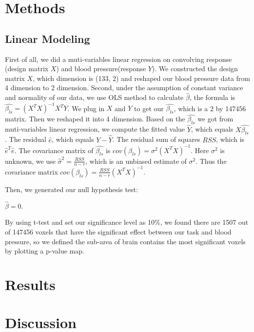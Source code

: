 \documentclass[11pt]{article}
\begin{document}
\section{Methods}
\subsection{Linear Modeling}
First of all, we did a muti-variables linear regression on convolving response 
(design matrix $X$) and blood pressure(response $Y$). We constructed the design 
matrix $X$, which dimension is (133, 2) and reshaped our blood pressure data from 
4 dimension to 2 dimension. Second, under the assumption of constant variance
and normality of our data, we use OLS method to calculate $\hat{\beta}$, the 
formula is $\hat{\beta_{ls}}=(X^{T}X)^{-1}X^{T}Y$. We plug in $X$ and $Y$ to get
our $\hat{\beta_{ls}}$, which is a 2 by 147456 matrix. Then we reshaped it into 
4 dimension. Based on the $\hat{\beta_{ls}}$ we got from muti-variables linear 
regression, we compute the fitted value $\hat{Y}$, which equals 
$X\hat{\beta_{ls}}$. The residual $\hat{e}$, which equals $Y-\hat{Y}$. The 
residual sum of squares $RSS$, which is $\hat{e}^{T}\hat{e}$. The covariance
matrix of $\hat{\beta_{ls}}$ is $cov(\beta_{ls}) = \sigma^2(X^{T}X)^{-1}$. Here $\sigma^2$
is unknown, we use $\hat{\sigma}^2 = \frac{RSS}{n-r}$, which is an unbiased 
estimate of $\sigma^2$. Thus the covariance matrix 
$cov(\beta_{ls}) = \frac{RSS}{n-r}(X^{T}X)^{-1}$.

Then, we generated our null hypothesis test:

$\hat{\beta} = 0$.

By using t-test and set our significance level as 10\%, we found there are 1507 
out of 147456 voxels that have the significant effect between our task and 
blood pressure, so we defined the sub-area of brain contains the most 
significant voxels by plotting a p-value map.

\section{Results}
\section{Discussion}



\end{document}
